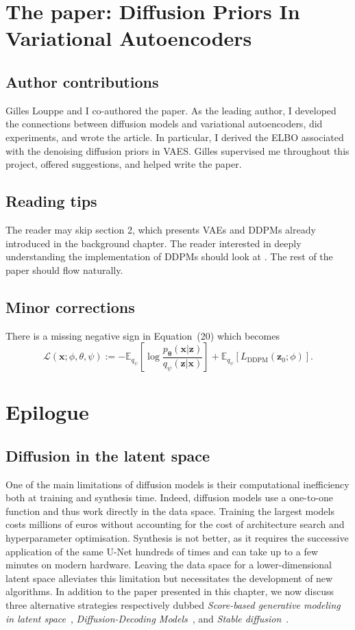 \section{The paper: Diffusion Priors In Variational Autoencoders}

\subsection{Author contributions}
Gilles Louppe and I co-authored the paper. As the leading author, I developed the connections between diffusion models and variational autoencoders, did experiments, and wrote the article. In particular, I derived the ELBO associated with the denoising diffusion priors in VAES. Gilles supervised me throughout this project, offered suggestions, and helped write the paper.

\subsection{Reading tips}
The reader may skip section 2, which presents VAEs and DDPMs already introduced in the background chapter. The reader interested in deeply understanding the implementation of DDPMs should look at \citet{ho_denoising_2020}. The rest of the paper should flow naturally.

\subsection{Minor corrections}
There is a missing negative sign in Equation~(20) which becomes
$$\mathcal{L}(\mathbf{x}; \phi, \theta, \psi) := -\mathbb{E}_{q_{\psi}}\left[\log \frac{p_{\mathbf{\theta}}(\mathbf{x}|\mathbf{z})}{q_{\psi}(\mathbf{z}|\mathbf{x})} \right] + \mathbb{E}_{q_{\psi}}\left[ L_{\text{DDPM}}(\mathbf{z}_0; \phi)\right].$$



\section{Epilogue}
\subsection{Diffusion in the latent space}
One of the main limitations of diffusion models is their computational inefficiency both at training and synthesis time. Indeed, diffusion models use a one-to-one function and thus work directly in the data space. Training the largest models costs millions of euros without accounting for the cost of architecture search and hyperparameter optimisation. Synthesis is not better, as it requires the successive application of the same U-Net hundreds of times and can take up to a few minutes on modern hardware. Leaving the data space for a lower-dimensional latent space alleviates this limitation but necessitates the development of new algorithms. In addition to the paper presented in this chapter, we now discuss three alternative strategies respectively dubbed \textit{Score-based generative modeling in latent space}~\citep{vahdat2021score}, \textit{Diffusion-Decoding Models}~\citep{sinha2021d2c}, and \textit{Stable diffusion}~\citep{rombach2022high}.

